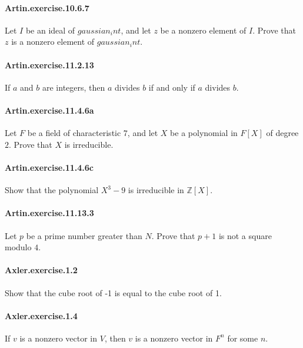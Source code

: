 \documentclass{article}
\begin{document}
\paragraph{Artin.exercise.10.6.7} Let $I$ be an ideal of $gaussian_int$, and let $z$ be a nonzero element of $I$. Prove that $z$ is a nonzero element of $gaussian_int$.

\paragraph{Artin.exercise.11.2.13} If $a$ and $b$ are integers, then $a$ divides $b$ if and only if $a$ divides $b$.

\paragraph{Artin.exercise.11.4.6a} Let $F$ be a field of characteristic $7$, and let $X$ be a polynomial in $F[X]$ of degree $2$. Prove that $X$ is irreducible.

\paragraph{Artin.exercise.11.4.6c} Show that the polynomial $X^3 - 9$ is irreducible in $\mathbb{Z}[X]$.

\paragraph{Artin.exercise.11.13.3} Let $p$ be a prime number greater than $N$. Prove that $p + 1$ is not a square modulo $4$.


\paragraph{Axler.exercise.1.2} Show that the cube root of -1 is equal to the cube root of 1.

\paragraph{Axler.exercise.1.4} If $v$ is a nonzero vector in $V$, then $v$ is a nonzero vector in $F^n$ for some $n$.
\end{document}
